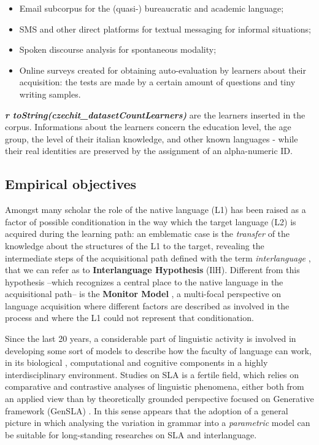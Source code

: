 \documentclass[
  a4paper,
  twoside,
  12pt,
  chapterprefix=false,
  bibliography=totocnumbered,
  listof=flat]{scrbook}
\providecommand{\tightlist}{%
  \setlength{\itemsep}{0pt}\setlength{\parskip}{0pt}}
\begin{document}
\begin{itemize}
\tightlist
\item
  Email subcorpus for the (quasi-) bureaucratic and academic language;
\item
  SMS and other direct platforms for textual messaging for informal situations;
\item
  Spoken discourse analysis for spontaneous modality;
\item
  Online surveys created for obtaining auto-evaluation by learners about their acquisition: the tests are made by a certain amount of questions and tiny writing samples.
\end{itemize}

\textbf{\emph{r toString(czechit\_datasetCountLearners)}} are the learners inserted in the corpus. Informations about the learners concern the education level, the age group, the level of their italian knowledge, and other known languages - while their real identities are preserved by the assignment of an alpha-numeric ID.

\hypertarget{empirical-objectives}{%
\subsection{Empirical objectives}\label{empirical-objectives}}

Amongst many scholar the role of the native language (L1) has been raised as a factor of possible conditionation in the way which the target language (L2) is acquired during the learning path: an emblematic case is the \emph{transfer} of the knowledge about the structures of the L1 to the target, revealing the intermediate steps of the acquisitional path defined with the term \emph{interlanguage} \citep{selinker1972}, that we can refer as to \textbf{Interlanguage Hypothesis} (IlH). Different from this hypothesis --which recognizes a central place to the native language in the acquisitional path-- is the \textbf{Monitor Model} \citep{krashen1981}, a multi-focal perspective on language acquisition where different factors are described as involved in the process and where the L1 could not represent that conditionation.

Since the last 20 years, a considerable part of linguistic activity is involved in developing some sort of models to describe how the faculty of language can work, in its biological \citep{hcf2002}, computational \citep{fodor2001} and cognitive components in a highly interdisciplinary environment.
Studies on SLA is a fertile field, which relies on comparative and contrastive analyses of linguistic phenomena, either both from an applied view \citep{ellis1994} than by theoretically grounded perspective focused on Generative framework (GenSLA) \citep{guasti2002, hawkins2001, rothmanslabakova2017, sorace2011}.
In this sense appears that the adoption of a general picture in which analysing the variation in grammar into a \emph{parametric} model \citep{chomsky1995} can be suitable for long-standing researches on SLA and interlanguage.
\end{document}
